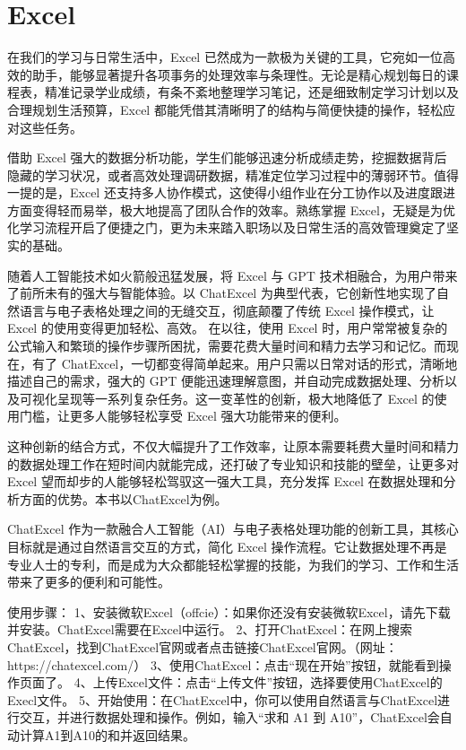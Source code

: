 \section{Excel}\label{sec:Excel}
在我们的学习与日常生活中，Excel 已然成为一款极为关键的工具，它宛如一位高效的助手，能够显著提升各项事务的处理效率与条理性。无论是精心规划每日的课程表，精准记录学业成绩，有条不紊地整理学习笔记，还是细致制定学习计划以及合理规划生活预算，Excel 都能凭借其清晰明了的结构与简便快捷的操作，轻松应对这些任务。

借助 Excel 强大的数据分析功能，学生们能够迅速分析成绩走势，挖掘数据背后隐藏的学习状况，或者高效处理调研数据，精准定位学习过程中的薄弱环节。值得一提的是，Excel 还支持多人协作模式，这使得小组作业在分工协作以及进度跟进方面变得轻而易举，极大地提高了团队合作的效率。熟练掌握 Excel，无疑是为优化学习流程开启了便捷之门，更为未来踏入职场以及日常生活的高效管理奠定了坚实的基础。

随着人工智能技术如火箭般迅猛发展，将 Excel 与 GPT 技术相融合，为用户带来了前所未有的强大与智能体验。以 ChatExcel 为典型代表，它创新性地实现了自然语言与电子表格处理之间的无缝交互，彻底颠覆了传统 Excel 操作模式，让 Excel 的使用变得更加轻松、高效。
在以往，使用 Excel 时，用户常常被复杂的公式输入和繁琐的操作步骤所困扰，需要花费大量时间和精力去学习和记忆。而现在，有了 ChatExcel，一切都变得简单起来。用户只需以日常对话的形式，清晰地描述自己的需求，强大的 GPT 便能迅速理解意图，并自动完成数据处理、分析以及可视化呈现等一系列复杂任务。这一变革性的创新，极大地降低了 Excel 的使用门槛，让更多人能够轻松享受 Excel 强大功能带来的便利。

这种创新的结合方式，不仅大幅提升了工作效率，让原本需要耗费大量时间和精力的数据处理工作在短时间内就能完成，还打破了专业知识和技能的壁垒，让更多对 Excel 望而却步的人能够轻松驾驭这一强大工具，充分发挥 Excel 在数据处理和分析方面的优势。本书以ChatExcel为例。

ChatExcel 作为一款融合人工智能（AI）与电子表格处理功能的创新工具，其核心目标就是通过自然语言交互的方式，简化 Excel 操作流程。它让数据处理不再是专业人士的专利，而是成为大众都能轻松掌握的技能，为我们的学习、工作和生活带来了更多的便利和可能性。

使用步骤：
1、安装微软Excel（offcie）：如果你还没有安装微软Excel，请先下载并安装。ChatExcel需要在Excel中运行。
2、打开ChatExcel：在网上搜索ChatExcel，找到ChatExcel官网或者点击链接ChatExcel官网。（网址：https://chatexcel.com/）
3、使用ChatExcel：点击“现在开始”按钮，就能看到操作页面了。
4、上传Excel文件：点击“上传文件”按钮，选择要使用ChatExcel的Execl文件。
5、开始使用：在ChatExcel中，你可以使用自然语言与ChatExcel进行交互，并进行数据处理和操作。例如，输入“求和 A1 到 A10”，ChatExcel会自动计算A1到A10的和并返回结果。

